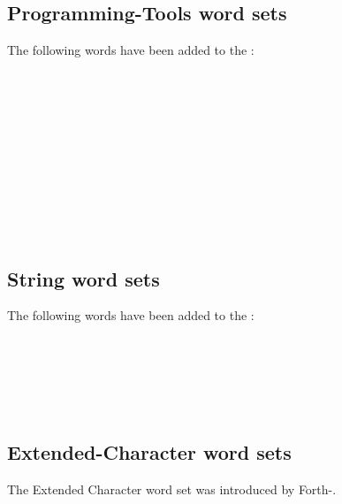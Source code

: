 
\subsection{Programming-Tools word sets}
\label{diff:12:tools}
The following words have been added to the :

\begin{minipage}[t]{0.45\linewidth}
	 \\
	 \\
	 \\
	 \\
	 \\
\end{minipage}
\hfill
\begin{minipage}[t]{0.45\linewidth}
	 \\
	 \\
	 \\
	\\
\end{minipage}


\subsection{String word sets}
The following words have been added to the :

\begin{minipage}[t]{0.3\linewidth}
	 \\
\end{minipage}
\hfill
\begin{minipage}[t]{0.3\linewidth}
	 \\
\end{minipage}
\hfill
\begin{minipage}[t]{0.3\linewidth}
	 \\
\end{minipage}

\subsection{Extended-Character word sets}
The Extended Character word set was introduced by Forth-\snapshot.

